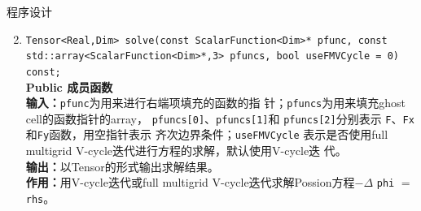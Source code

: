 \documentclass{beamer}
\begin{document}
\begin{frame}{程序设计}
  \begin{enumerate}[(1)] \setcounter{enumi}{1}
                            \item \texttt{Tensor<Real,Dim> solve(const ScalarFunction<Dim>* pfunc, const
                         std::array<ScalarFunction<Dim>*,3>
                         pfuncs, bool useFMVCycle = 0) const;
                       }\\
          \textbf{Public 成员函数}\\
          \textbf{输入：}\texttt{pfunc}为用来进行右端项填充的函数的指
          针；\texttt{pfuncs}为用来填充ghost cell的函数指针的array，
                \texttt{pfuncs[0]}、\texttt{pfuncs[1]}和
                \texttt{pfuncs[2]}分别表示
                \texttt{F}、\texttt{Fx}和\texttt{Fy}函数，用空指针表示
                齐次边界条件；\texttt{useFMVCycle} 表示是否使用full
                multigrid V-cycle迭代进行方程的求解，默认使用V-cycle迭
                代。 \\
          \textbf{输出：}以Tensor的形式输出求解结果。\\
          \textbf{作用：}用V-cycle迭代或full
          multigrid V-cycle迭代求解Possion方程$-\Delta$ \texttt{phi} $=$
          \texttt{rhs}。
        \end{enumerate}

      \end{frame}
\end{document}
